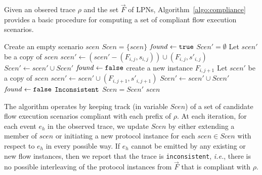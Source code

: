 \documentclass[conference]{IEEEtran}
\newcommand{\ie}{\mbox{{\em i.e.}}}
\begin{document}
Given an obsered trace $\rho$ and the set $\vec{F}$ of LPNs,
Algorithm~\ref{algo:compliance} provides a basic procedure for
computing a set of compliant flow execution scenarios.
\begin{algorithm}[ht]
\DontPrintSemicolon
Create an empty scenario $scen$\;
$\mathit{Scen} = \{scen\}$\;
 {
	$\mathit{found} \gets {\tt true}$ \;
	$Scen' = \emptyset$\;
	 {
  		 {
    		 {
				Let $scen'$ be a copy of $scen$\;
      		$\mathit{scen'} \gets (\mathit{scen'} - (F_{i,j}, s_{i,j})) \cup (F_{i,j}, s'_{i,j})$\;
      		$\mathit{Scen'} \gets \mathit{scen'} \cup \mathit{Scen'}$\;
      		$\mathit{found} \gets {\tt false}$ \;
    		}
  		}
  		 {
      	create a new instance $F_{i, j+1}$ \;
      	 {
    			Let $scen'$ be a copy of $scen$\;
				$\mathit{scen'} \gets \mathit{scen'} \cup (F_{i,j+1}, s'_{i,j+1})$ \;
				$\mathit{Scen'} \gets \mathit{scen'} \cup \mathit{Scen'}$\;
        		$\mathit{found} \gets {\tt false}$ \;
      	}
    	}
	}
   {
    \Return ${\tt Inconsistent}$\;
  }
  $Scen = Scen'$\;
}
\Return $\mathit{scen}$ \;
\caption{$\textsc{Check-Compliance}(\vec{F}, \, \rho)$}
\label{algo:compliance}
\end{algorithm}
The algorithm operates by keeping track (in variable
$\mathit{Scen}$) of a set of candidate flow execution scenarios
compliant with each prefix of $\rho$.  At each iteration,
for each event $e_h$ in the observed trace, we
update $Scen$ by either extending a member of
$\mathit{scen}$ or initiating a new protocol instance for 
each $scen \in Scen$ with respect to $e_h$ in every possible way.
If $e_h$ cannot be emitted by any existing or new flow instances, 
then we report that the trace is {\tt  inconsistent}, \ie, 
there is no possible interleaving of
the protocol instances from $\vec{F}$ that is compliant with
$\rho$.
\end{document}
